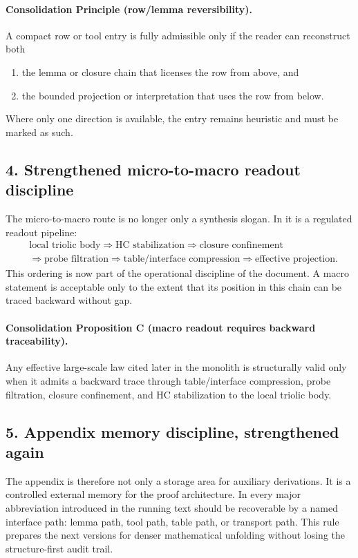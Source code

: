\paragraph{Consolidation Principle (row/lemma reversibility).}
A compact row or tool entry is fully admissible only if the reader can reconstruct
both
\begin{enumerate}[leftmargin=2em,label=(\alph*)]
 \item the lemma or closure chain that licenses the row from above, and
 \item the bounded projection or interpretation that uses the row from below.
\end{enumerate}
Where only one direction is available, the entry remains heuristic and must be
marked as such.

\subsection*{4. Strengthened micro-to-macro readout discipline}
The micro-to-macro route is no longer only a synthesis slogan. In  it is
a regulated readout pipeline:
\[
\begin{aligned}
&\text{local triolic body} \Longrightarrow \text{HC stabilization} \Longrightarrow \text{closure confinement}\\
&\Longrightarrow \text{probe filtration} \Longrightarrow \text{table/interface compression} \Longrightarrow \text{effective projection}.
\end{aligned}
\]
This ordering is now part of the operational discipline of the document. A macro
statement is acceptable only to the extent that its position in this chain can be
traced backward without gap.

\paragraph{Consolidation Proposition C (macro readout requires backward traceability).}
Any effective large-scale law cited later in the monolith is structurally valid only
when it admits a backward trace through table/interface compression, probe
filtration, closure confinement, and HC stabilization to the local triolic body.

\subsection*{5. Appendix memory discipline, strengthened again}
The appendix is therefore not only a storage area for auxiliary derivations. It is
a controlled external memory for the proof architecture. In  every major
abbreviation introduced in the running text should be recoverable by a named
interface path: lemma path, tool path, table path, or transport path. This rule
prepares the next versions for denser mathematical unfolding without losing the
structure-first audit trail.

